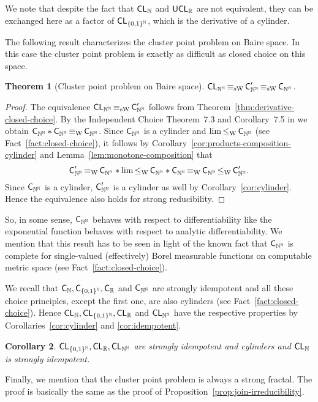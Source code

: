 \documentclass[a4paper]{amsart}
\def\IN{{\mathbb{N}}}
\def\IR{{\mathbb{R}}}
\def\Cantor{{\{0,1\}^\IN}}
\def\Baire{{\IN^\IN}}
\def\C{\mbox{\rm\sffamily C}}
\def\CL{\text{\rm\sffamily CL}}
\def\UCL{\text{\rm\sffamily UCL}}
\def\leqW{\mathop{\leq_{\mathrm{W}}}}
\def\equivW{\mathop{\equiv_{\mathrm{W}}}}
\def\equivSW{\mathop{\equiv_{\mathrm{sW}}}}
\newtheorem{theorem}{Theorem}[section]
\newtheorem{corollary}[theorem]{Corollary}
\theoremstyle{definition}
\begin{document}
We note that despite the fact that $\CL_\IN$ and $\UCL_\IR$ are not equivalent, they
can be exchanged here as a factor of $\CL_\Cantor$, which is the derivative of a cylinder. 

The following result characterizes the cluster point problem on Baire space.
In this case the cluster point problem is exactly as difficult as closed choice on this space.

\begin{theorem}[Cluster point problem on Baire space] 
\label{thm:cluster-Baire}
$\CL_\Baire\equivSW\C_\Baire'\equivSW\C_\Baire$.
\end{theorem}
\begin{proof}
The equivalence $\CL_\Baire\equivSW\C_\Baire'$ follows from Theorem~\ref{thm:derivative-closed-choice}.
By the Independent Choice Theorem~7.3 and Corollary~7.5 in \cite{BBP}
we obtain $\C_\Baire*\C_\Baire\equivW\C_\Baire$. Since
$\C_\Baire$ is a cylinder and $\lim\leqW\C_\Baire$ (see Fact~\ref{fact:closed-choice}), 
it follows by Corollary~\ref{cor:products-composition-cylinder}
and Lemma~\ref{lem:monotone-composition} that
\[\C_\Baire'\equivW\C_\Baire*\lim\leqW\C_\Baire*\C_\Baire\equivW\C_\Baire\leqW\C_\Baire'.\]
Since $\C_\Baire$ is a cylinder, $\C_\Baire'$ is a cylinder as well by Corollary~\ref{cor:cylinder}.
Hence the equivalence also holds for strong reducibility.
\end{proof}

So, in some sense, $\C_\Baire$ behaves with respect to differentiability like
the exponential function behaves with respect to analytic differentiability.
We mention that this result has to be seen in light of the known fact that
$\C_\Baire$ is complete for single-valued (effectively) Borel measurable functions 
on computable metric space (see Fact~\ref{fact:closed-choice}).

We recall that $\C_\IN,\C_\Cantor,\C_\IR$ and $\C_\Baire$ are
strongly idempotent and all these choice principles,
except the first one, are also cylinders (see Fact~\ref{fact:closed-choice}). Hence 
$\CL_\IN, \CL_\Cantor,\CL_\IR$ and $\CL_\Baire$ have the respective properties
by Corollaries~\ref{cor:cylinder} and \ref{cor:idempotent}.

\begin{corollary}
\label{cor:cluster-idempotent}
$\CL_\Cantor,\CL_\IR,\CL_\Baire$ are strongly idempotent and cylinders and $\CL_\IN$ is strongly idempotent.
\end{corollary}

Finally, we mention that the cluster point problem is always a strong fractal.
The proof is basically the same as the proof of Proposition~\ref{prop:join-irreducibility}.
\end{document}
